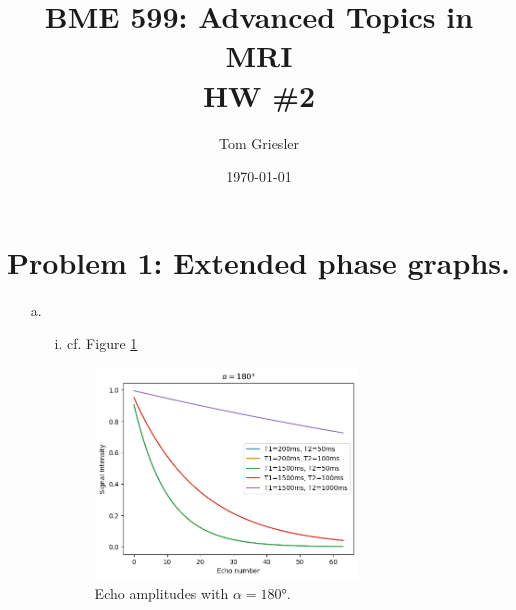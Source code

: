 \documentclass{article}
\title{BME 599: Advanced Topics in MRI\\HW \#2}
\author{Tom Griesler}
\date{\today}
\begin{document}
\maketitle

\section*{Problem 1: Extended phase graphs.}

\begin{itemize}

    \item[a.] %
    
        \begin{itemize}

            \item[i.] cf. Figure \ref{fig:1_a_i} %
            
                \begin{figure}[]
                    \centering
                    \includegraphics[width=0.7\textwidth]{figures/1_a_i.png}
                    \caption{Echo amplitudes with $\alpha=180$°.}
                    \label{fig:1_a_i}
                \end{figure}


\end{itemize}
\end{itemize}
\end{document}
